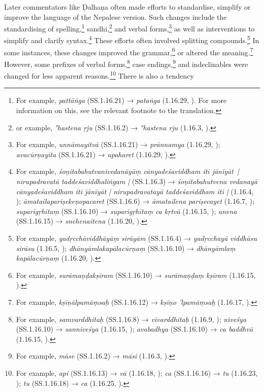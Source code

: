 Later commentators like Ḍalhaṇa often made efforts to standardise, simplify or improve 
the language of the Nepalese version. Such changes include the standardising of 
spelling,\footnote{For example, \emph{pattāṅga} (SS.1.16.21) → \emph{pataṅga} (1.16.29, 
\cite[81]{vulgate}). For more information on this, see the relevant footnote to the 
translation.} sandhi,\footnote{or example, \emph{°hastena ṛju} (SS.1.16.2) → 
\emph{°hastena rju} (1.16.3, \cite[76]{vulgate}).} and verbal forms,\footnote{For example, 
\emph{unnāmayitvā} (SS.1.16.21) → \emph{prānnamya} (1.16.29, \cite[81]{vulgate}); 
\emph{avacūrṇayīta} (SS.1.16.21) → \emph{upaharet} (1.16.29, \cite[81]{vulgate}).} as well 
as interventions to simplify and clarify syntax.\footnote{For example, 
\emph{śoṇitabahutvanivedanāyāṃ cānyadeśaviddham iti jānīyāt | nirupadravatā 
taddeśaviddhaliṅgam |} (SS.1.16.3) → \emph{śoṇitabahutvena vedanayā cānyadeśaviddham 
iti jānīyāt | nirupadravatayā taddeśaviddham iti |} (1.16.4, \cite[76]{vulgate}); 
\emph{āmatailapariṣekeṇopacaret} (SS.1.16.6) → \emph{āmatailena pariṣecayet} (1.16.7, 
\cite[77]{vulgate}); \emph{suparigṛhītaṃ} (SS.1.16.10) → \emph{suparigṛhītaṃ ca kṛtvā} 
(1.16.15, \cite[78]{vulgate}); \emph{anena} (SS.1.16.15) → \emph{snehenaitena} (1.16.20, 
\cite[79]{vulgate}).} These efforts often involved splitting compounds.\footnote{For 
example, 
\emph{yadṛcchāviddhāyāṃ sirāyām} (SS.1.16.4) → \emph{yadṛcchayā viddhāsu sirāsu} 
(1.16.5, \cite[76]{vulgate}); \emph{dhānyāmlakapālacūrṇaṃ} (SS.1.16.10) → 
\emph{dhānyāmlaṃ kapālacūrṇaṃ} (1.16.20, \cite[78]{vulgate}).} In some instances, these 
changes improved the grammar,\footnote{For example, \emph{surāmaṇḍakṣīram} 
(SS.1.16.10) → \emph{surāmaṇḍaṃ kṣīram} (1.16.15, \cite[78]{vulgate}).} or altered the 
meaning.\footnote{For example, \emph{kṣīṇālpamāṃsaḥ} (SS.1.16.12) → \emph{kṣīṇo 
'lpamāṃsaḥ} (1.16.17, \cite[79]{vulgate}).} However, some prefixes of verbal 
forms,\footnote{For example, \emph{samvarddhitaḥ} (SS.1.16.8) → \emph{vivarddhitaḥ} 
(1.16.9, \cite[77]{vulgate}); \emph{niveśya} (SS.1.16.10) → \emph{sanniveśya} (1.16.15, 
\cite[78]{vulgate}); \emph{avabadhya} (SS.1.16.10) → \emph{ca baddhvā} (1.16.15, 
\cite[78]{vulgate}).} case endings,\footnote{For example, \emph{māse} (SS.1.16.2) → 
\emph{māsi} (1.16.3, \cite[76]{vulgate}).} and indeclinables were changed for less apparent 
reasons.\footnote{For example, \emph{api} (SS.1.16.13) → \emph{vā} (1.16.18, 
\cite[79]{vulgate}); \emph{ca} (SS.1.16.16) → \emph{tu} (1.16.23, \cite[79]{vulgate}); 
\emph{tu} (SS.1.16.18) → \emph{ca} (1.16.25, \cite[80]{vulgate}).} There is also a tendency 

